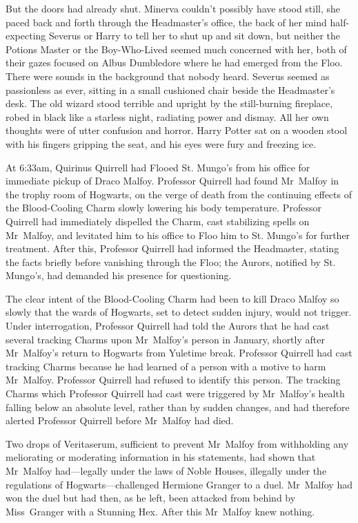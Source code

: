 But the doors had already shut.
\later
Minerva couldn't possibly have stood still, she paced back and forth through
the Headmaster's office, the back of her mind half-expecting Severus or Harry
to tell her to shut up and sit down, but neither the Potions Master or the
Boy-Who-Lived seemed much concerned with her, both of their gazes focused on
Albus Dumbledore where he had emerged from the Floo. There were sounds in the
background that nobody heard. Severus seemed as passionless as ever, sitting in
a small cushioned chair beside the Headmaster's desk. The old wizard stood
terrible and upright by the still-burning fireplace, robed in black like a
starless night, radiating power and dismay. All her own thoughts were of utter
confusion and horror. Harry Potter sat on a wooden stool with his fingers
gripping the seat, and his eyes were fury and freezing ice.

At 6:33am, Quirinus Quirrell had Flooed St. Mungo's from his office for
immediate pickup of Draco Malfoy. Professor Quirrell had found Mr~Malfoy in
the trophy room of Hogwarts, on the verge of death from the continuing effects
of the Blood-Cooling Charm slowly lowering his body temperature. Professor
Quirrell had immediately dispelled the Charm, cast stabilizing spells on
Mr~Malfoy, and levitated him to his office to Floo him to St. Mungo's for
further treatment. After this, Professor Quirrell had informed the Headmaster,
stating the facts briefly before vanishing through the Floo; the Aurors,
notified by St. Mungo's, had demanded his presence for questioning.

The clear intent of the Blood-Cooling Charm had been to kill Draco Malfoy so
slowly that the wards of Hogwarts, set to detect sudden injury, would not
trigger. Under interrogation, Professor Quirrell had told the Aurors that he
had cast several tracking Charms upon Mr~Malfoy's person in January, shortly
after Mr~Malfoy's return to Hogwarts from Yuletime break. Professor Quirrell
had cast tracking Charms because he had learned of a person with a motive to
harm Mr~Malfoy. Professor Quirrell had refused to identify this person. The
tracking Charms which Professor Quirrell had cast were triggered by
Mr~Malfoy's health falling below an absolute level, rather than by sudden
changes, and had therefore alerted Professor Quirrell before Mr~Malfoy had
died.

Two drops of Veritaserum, sufficient to prevent Mr~Malfoy from withholding any
meliorating or moderating information in his statements, had shown that
Mr~Malfoy had—legally under the laws of Noble Houses, illegally under the
regulations of Hogwarts—challenged Hermione Granger to a duel. Mr~Malfoy had
won the duel but had then, as he left, been attacked from behind by
Miss~Granger with a Stunning Hex. After this Mr~Malfoy knew nothing.

